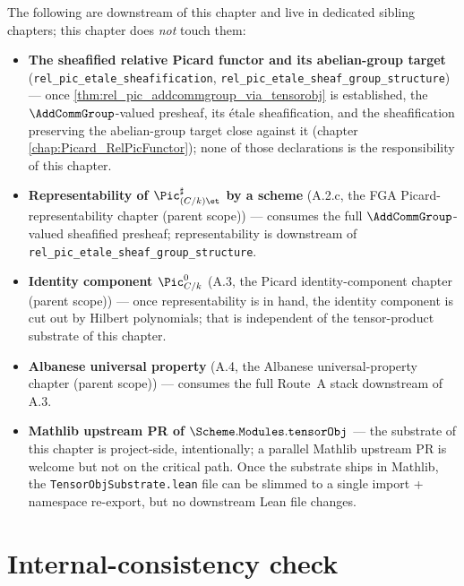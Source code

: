 The following are downstream of this chapter and live in dedicated
sibling chapters; this chapter does \emph{not} touch them:
\begin{itemize}
  \item \textbf{The sheafified relative Picard functor and its abelian-group target}
    (\texttt{rel\_pic\_etale\_sheafification}, \texttt{rel\_pic\_etale\_sheaf\_group\_structure}) --- once
    \cref{thm:rel_pic_addcommgroup_via_tensorobj} is established, the
    \(\AddCommGroup\)-valued presheaf, its \'etale sheafification, and
    the sheafification preserving the abelian-group target close
    against it (chapter \cref{chap:Picard_RelPicFunctor}); none of those
    declarations is the responsibility of this chapter.
  \item \textbf{Representability of \(\Pic^\sharp_{(C/k)\et}\) by a scheme}
    (A.2.c, the FGA Picard-representability chapter (parent scope)) --- consumes the
    full \(\AddCommGroup\)-valued sheafified presheaf;
    representability is downstream of \texttt{rel\_pic\_etale\_sheaf\_group\_structure}.
  \item \textbf{Identity component \(\Pic^0_{C/k}\)} (A.3,
    the Picard identity-component chapter (parent scope)) --- once representability is
    in hand, the identity component is cut out by Hilbert polynomials;
    that is independent of the tensor-product substrate of this chapter.
  \item \textbf{Albanese universal property} (A.4,
    the Albanese universal-property chapter (parent scope)) --- consumes the full Route~A stack
    downstream of A.3.
  \item \textbf{Mathlib upstream PR of \(\Scheme.\mathtt{Modules}.\mathtt{tensorObj}\)} ---
    the substrate of this chapter is project-side, intentionally; a
    parallel Mathlib upstream PR is welcome but not on the critical
    path. Once the substrate ships in Mathlib, the
    \texttt{TensorObjSubstrate.lean} file can be slimmed to a single
    import + namespace re-export, but no downstream Lean file changes.
\end{itemize}

\section{Internal-consistency check}
\label{sec:tensorobj_consistency_check}

